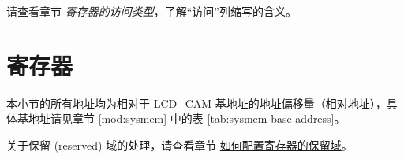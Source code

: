 \documentclass[main\_\_CN.tex]{subfiles}
\begin{document}
请查看章节 \hyperref[glossary-access-types]{\textit{寄存器的访问类型}}，了解“访问”列缩写的含义。






\newpage
\section{寄存器}

本小节的所有地址均为相对于 LCD\_CAM 基地址的地址偏移量（相对地址），具体基地址请见章节 \ref{mod:sysmem} \textit{} 中的表 \ref{tab:sysmem-base-address}。

关于保留 (reserved) 域的处理，请查看章节 \hyperref[programming-reserved-field]{如何配置寄存器的保留域}。


\end{document}
